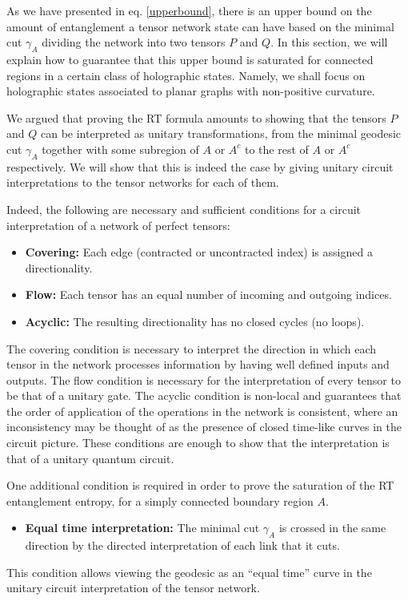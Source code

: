 \documentclass[12pt]{article}
\theoremstyle{plain}
\theoremstyle{plain}
\theoremstyle{plain}
\theoremstyle{plain}
\theoremstyle{result}
\theoremstyle{remark}
\theoremstyle{conjecture}
\theoremstyle{observation}
\theoremstyle{definition}
\theoremstyle{corollary}
\theoremstyle{definition}
\theoremstyle{definition}
\theoremstyle{assumption}
\theoremstyle{definition}
\theoremstyle{problem}
\theoremstyle{fact}
\begin{document}
As we have presented in eq. \ref{upperbound}, there is an upper bound on the amount of entanglement a tensor network state can have based on the minimal cut $\gamma_A$ dividing the network into two tensors $P$ and $Q$.
In this section, we will explain how to guarantee that this upper bound is saturated for connected regions in a certain class of holographic states.
Namely, we shall focus on holographic states associated to planar graphs with non-positive curvature.

We argued that proving the RT formula amounts to showing that the tensors $P$ and $Q$ can be interpreted as unitary transformations, from the minimal geodesic cut $\gamma_A$ together with some subregion of $A$ or $A^c$ to the rest of $A$ or $A^c$ respectively.  
We will show that this is indeed the case by giving unitary circuit interpretations to the tensor networks for each of them.

Indeed, the following are necessary and sufficient conditions for a circuit interpretation of a network of perfect tensors:
\begin{itemize}
\item {\bf Covering:} Each edge (contracted or uncontracted index) is assigned a directionality.
\item{\bf Flow:} Each tensor has an equal number of incoming and outgoing indices.
\item{\bf Acyclic:} The resulting directionality has no closed cycles (no loops).
\end{itemize}
The covering condition is necessary to interpret the direction in which each tensor in the network processes information by having well defined inputs and outputs.
The flow condition is necessary for the interpretation of every tensor to be that of a unitary gate.
The acyclic condition is non-local and guarantees that the order of application of the operations in the network is consistent, where an inconsistency may be thought of as the presence of closed time-like curves in the circuit picture.
These conditions are enough to show that the interpretation is that of a unitary quantum circuit.

One additional condition is required in order to prove the saturation of the RT entanglement entropy,  for a simply connected boundary region $A$. 
\begin{itemize}
\item {\bf Equal time interpretation:} The minimal cut $\gamma_A$ is crossed in the same direction by the directed interpretation of each link that it cuts.
\end{itemize}
This condition allows viewing the geodesic as an ``equal time'' curve in the unitary circuit interpretation of the tensor network.
\end{document}
